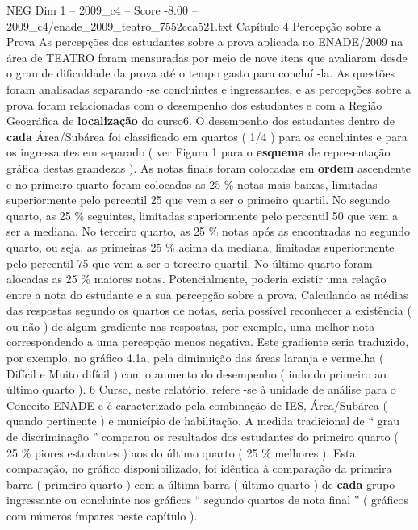 \begin{textsample}{NEG Dim 1 – 2009\_c4 – Score -8.00 – 2009\_c4/enade\_2009\_teatro\_7552cca521.txt}  \label{ex:f1_neg_027}
Capítulo 4 Percepção sobre a Prova As percepções dos estudantes sobre a prova aplicada no ENADE/2009 na área de TEATRO foram mensuradas por meio de nove itens que avaliaram desde o grau de dificuldade da prova até o tempo gasto para concluí -la.
As questões foram analisadas separando -se concluintes e ingressantes, e as percepções sobre a prova foram relacionadas com o desempenho dos estudantes e com a Região Geográfica de \textbf{localização} do curso6.
O desempenho dos estudantes dentro de \textbf{cada} Área/Subárea foi classificado em quartos ( 1/4 ) para os concluintes e para os ingressantes em separado ( ver Figura 1 para o \textbf{esquema} de representação gráfica destas grandezas ).
As notas finais foram colocadas em \textbf{ordem} ascendente e no primeiro quarto foram colocadas as 25 \% notas mais baixas, limitadas superiormente pelo percentil 25 que vem a ser o primeiro quartil.
No segundo quarto, as 25 \% seguintes, limitadas superiormente pelo percentil 50 que vem a ser a mediana.
No terceiro quarto, as 25 \% notas após as encontradas no segundo quarto, ou seja, as primeiras 25 \% acima da mediana, limitadas superiormente pelo percentil 75 que vem a ser o terceiro quartil.
No último quarto foram alocadas as 25 \% maiores notas.
Potencialmente, poderia existir uma relação entre a nota do estudante e a sua percepção sobre a prova.
Calculando as médias das respostas segundo os quartos de notas, seria possível reconhecer a existência ( ou não ) de algum gradiente nas respostas, por exemplo, uma melhor nota correspondendo a uma percepção menos negativa.
Este gradiente seria traduzido, por exemplo, no gráfico 4.1a, pela diminuição das áreas laranja e vermelha ( Difícil e Muito difícil ) com o aumento do desempenho ( indo do primeiro ao último quarto ). 6 Curso, neste relatório, refere -se à unidade de análise para o Conceito ENADE e é caracterizado pela combinação de IES, Área/Subárea ( quando pertinente ) e município de habilitação.
A medida tradicional de “ grau de discriminação ” comparou os resultados dos estudantes do primeiro quarto ( 25 \% piores estudantes ) aos do último quarto ( 25 \% melhores ).
Esta comparação, no gráfico disponibilizado, foi idêntica à comparação da primeira barra ( primeiro quarto ) com a última barra ( último quarto ) de \textbf{cada} grupo ingressante ou concluinte nos gráficos “ segundo quartos de nota final ” ( gráficos com números ímpares neste capítulo ).

\end{textsample}
